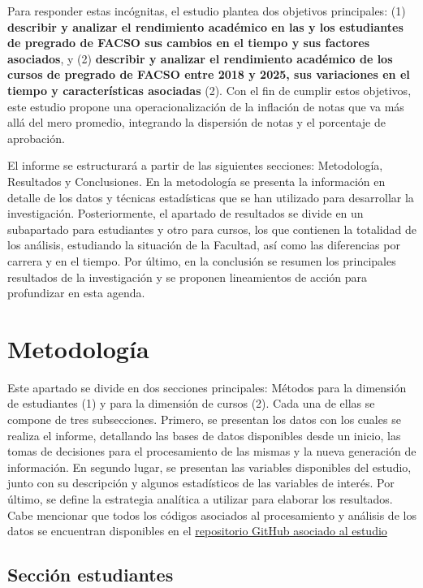 \documentclass[
  spanish,
  a4paper,
  oneside]{scrbook}
\begin{document}
Para responder estas incógnitas, el estudio plantea dos objetivos
principales: (1) \textbf{describir y analizar el rendimiento académico
en las y los estudiantes de pregrado de FACSO sus cambios en el tiempo y
sus factores asociados}, y (2) \textbf{describir y analizar el
rendimiento académico de los cursos de pregrado de FACSO entre 2018 y
2025, sus variaciones en el tiempo y características asociadas} (2). Con
el fin de cumplir estos objetivos, este estudio propone una
operacionalización de la inflación de notas que va más allá del mero
promedio, integrando la dispersión de notas y el porcentaje de
aprobación.

El informe se estructurará a partir de las siguientes secciones:
Metodología, Resultados y Conclusiones. En la metodología se presenta la
información en detalle de los datos y técnicas estadísticas que se han
utilizado para desarrollar la investigación. Posteriormente, el apartado
de resultados se divide en un subapartado para estudiantes y otro para
cursos, los que contienen la totalidad de los análisis, estudiando la
situación de la Facultad, así como las diferencias por carrera y en el
tiempo. Por último, en la conclusión se resumen los principales
resultados de la investigación y se proponen lineamientos de acción para
profundizar en esta agenda.


\chapter{Metodología}\label{metodologuxeda}

Este apartado se divide en dos secciones principales: Métodos para la
dimensión de estudiantes (1) y para la dimensión de cursos (2). Cada una
de ellas se compone de tres subsecciones. Primero, se presentan los
datos con los cuales se realiza el informe, detallando las bases de
datos disponibles desde un inicio, las tomas de decisiones para el
procesamiento de las mismas y la nueva generación de información. En
segundo lugar, se presentan las variables disponibles del estudio, junto
con su descripción y algunos estadísticos de las variables de interés.
Por último, se define la estrategia analítica a utilizar para elaborar
los resultados. Cabe mencionar que todos los códigos asociados al
procesamiento y análisis de los datos se encuentran disponibles en el
\href{https://github.com/tomasurzuam/estudio-notas}{repositorio GitHub
asociado al estudio}

\section{Sección estudiantes}\label{secciuxf3n-estudiantes}
\end{document}
